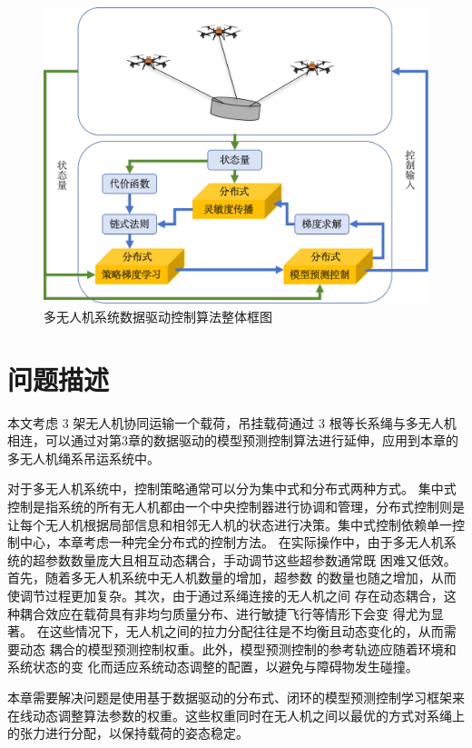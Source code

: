 \documentclass[lang=chs, degree=master, blindreview=false, winfonts=true]{yanputhesis}
\begin{document}
\begin{figure}[hbt!]
	\centering
	\includegraphics[width=38pc]{picture/4_1.png} 
	\caption{多无人机系统数据驱动控制算法整体框图} 
	\label{4_1}
\end{figure}


\section{问题描述}
本文考虑 3 架无人机协同运输一个载荷，吊挂载荷通过 3 根等长系绳与多无人机相连，可以通过对第3章的数据驱动的模型预测控制算法进行延伸，应用到本章的多无人机绳系吊运系统中。

对于多无人机系统中，控制策略通常可以分为集中式和分布式两种方式。
集中式控制是指系统的所有无人机都由一个中央控制器进行协调和管理，分布式控制则是让每个无人机根据局部信息和相邻无人机的状态进行决策。集中式控制依赖单一控制中心，本章考虑一种完全分布式的控制方法。
在实际操作中，由于多无人机系统的超参数数量庞大且相互动态耦合，手动调节这些超参数通常既
困难又低效。首先，随着多无人机系统中无人机数量的增加，超参数
的数量也随之增加，从而使调节过程更加复杂。其次，由于通过系绳连接的无人机之间
存在动态耦合，这种耦合效应在载荷具有非均匀质量分布、进行敏捷飞行等情形下会变
得尤为显著。
在这些情况下，无人机之间的拉力分配往往是不均衡且动态变化的，从而需要动态
耦合的模型预测控制权重。此外，模型预测控制的参考轨迹应随着环境和系统状态的变
化而适应系统动态调整的配置，以避免与障碍物发生碰撞。

本章需要解决问题是使用基于数据驱动的分布式、闭环的模型预测控制学习框架来在线动态调整算法参数的权重。这些权重同时在无人机之间以最优的方式对系绳上的张力进行分配，以保持载荷的姿态稳定。
\end{document}
